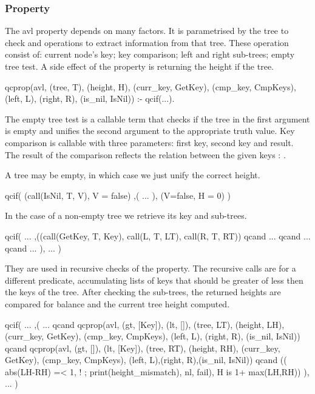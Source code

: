 \subsubsection*{Property}

The avl property depends on many factors.
%
It is parametrised by the tree to check and operations to extract
information from that tree.
%
These operation consist of: current node's key; key comparison; left and
right sub-trees; empty tree test.
%
A side effect of the property is returning the height if the tree.
%
\begin{yapcode}
 qcprop({avl, (tree, T), (height, H),
      (curr_key, GetKey), (cmp_key, CmpKeys),
      (left, L), (right, R),
      (is_nil, IsNil)}) :- 
   qcif(...).
\end{yapcode}
%
The empty tree test is a callable term that checks if the tree in the
first argument is empty and unifies the second argument to the
appropriate truth value.
%
Key comparison is callable with three parameters: first key, second key
and result.
%
The result of the comparison reflects the relation between the given
keys : .


A tree may be empty, in which case we just unify the correct height.
\begin{yapcode}
   qcif( (call(IsNil, T, V), V = false)
   ,(
     ...
   ),
   (V=false, H = 0) )
\end{yapcode}
%
In the case of a non-empty tree we retrieve its key and sub-trees.
%
\begin{yapcode}
   qcif( ...
   ,((call(GetKey, T, Key),
       call(L, T, LT),  call(R, T, RT))
   qcand
     ...
   qcand
     ...
   qcand
     ...
   ),
     ... )
\end{yapcode}
%
They are used in recursive checks of the property.
%
The recursive calls are for a different predicate, accumulating lists of
keys that should be greater of less then the keys of the tree.
%
After checking the sub-trees, the returned heights are compared for
balance and the current tree height computed.
%
\begin{yapcode}
   qcif( ...
   ,( ...
   qcand
     qcprop({avl, (gt, [Key]), (lt, []),
 (tree, LT), (height, LH),
 (curr_key, GetKey), (cmp_key, CmpKeys),
 (left, L), (right, R), (is_nil, IsNil)})
   qcand
     qcprop({avl, (gt, []), (lt, [Key]),
 (tree, RT), (height, RH),
 (curr_key, GetKey), (cmp_key, CmpKeys),
 (left, L),(right, R),(is_nil, IsNil)})
   qcand
     (( abs(LH-RH) =< 1, !
     ; print(height_mismatch), nl, fail),
     H is 1+ max(LH,RH))
   ),
     ... )
\end{yapcode}


